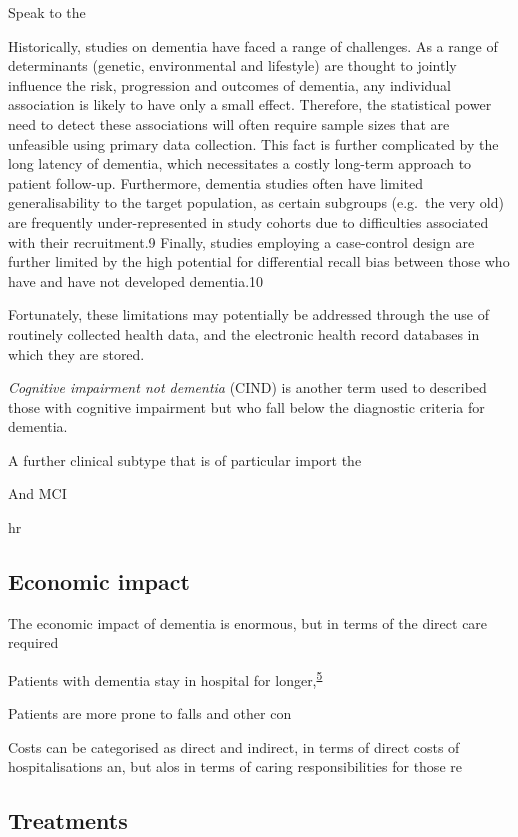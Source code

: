 \documentclass[a4paper, twoside]{templates/ociamthesis}
\begin{document}
Speak to the

Historically, studies on dementia have faced a range of challenges. As a range of determinants (genetic, environmental and lifestyle) are thought to jointly influence the risk, progression and outcomes of dementia, any individual association is likely to have only a small effect. Therefore, the statistical power need to detect these associations will often require sample sizes that are unfeasible using primary data collection. This fact is further complicated by the long latency of dementia, which necessitates a costly long-term approach to patient follow-up. Furthermore, dementia studies often have limited generalisability to the target population, as certain subgroups (e.g.~the very old) are frequently under-represented in study cohorts due to difficulties associated with their recruitment.9 Finally, studies employing a case-control design are further limited by the high potential for differential recall bias between those who have and have not developed dementia.10

Fortunately, these limitations may potentially be addressed through the use of routinely collected health data, and the electronic health record databases in which they are stored.

\emph{Cognitive impairment not dementia} (CIND) is another term used to described those with cognitive impairment but who fall below the diagnostic criteria for dementia.

A further clinical subtype that is of particular import the

And MCI

hr

\hypertarget{economic-impact}{%
\subsection{Economic impact}\label{economic-impact}}

The economic impact of dementia is enormous, but in terms of the direct care required

Patients with dementia stay in hospital for longer,\textsuperscript{\protect\hyperlink{ref-mollers2019}{5}}

Patients are more prone to falls and other con

Costs can be categorised as direct and indirect, in terms of direct costs of hospitalisations an, but alos in terms of caring responsibilities for those re

\hypertarget{treatments}{%
\subsection{Treatments}\label{treatments}}
\end{document}
